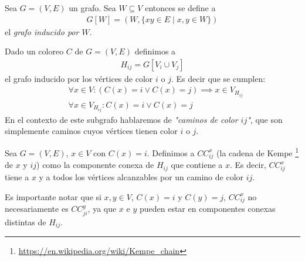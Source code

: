 \begin{comment}
\begin{proposition}\label{graph_cyclic_color}
  Un grafo cíclico $C_n$ con $n \ge 2$ es bipartito si $n$ es par y es
  $3$-coloreable si $n$ es impar. Es decir,
\begin{align}
    \chi(C_n) = 
    \begin{cases}
                2 & |\ \text{n es par} \\
                3 & |\ \text{n es impar}
    \end{cases}
\end{align}
\end{proposition}

\begin{proof}
  Visto en clase.
\end{proof}
\end{comment}

\begin{definition}
  Sea $G = (V, E)$ un grafo. Sea $W \subseteq V$ entonces se define a
  \begin{align}
    G[W] = \left(W, \{xy \in E \mid x,y \in W\}\right)
  \end{align}
  el \emph{grafo inducido por $W$}.
\end{definition}

\begin{definition}
Dado un coloreo $C$ de $G = (V,E)$ definimos a
\begin{align}
    H_{ij} = G\left[V_i \cup V_j\right]
\end{align}
el grafo inducido por los vértices de color $i$ o $j$.
Es decir que se cumplen:
\begin{align}
    &\forall x \in V \colon (C(x) = i \vee C(x) = j) \implies x \in V_{H_{ij}}\\
    &\forall x \in V_{H_{ij}} \colon C(x) = i \vee C(x) = j
\end{align}
En el contexto de este subgrafo hablaremos de \emph{"caminos de color $ij$"}, que son simplemente caminos cuyos vértices tienen color $i$ o $j$.
\end{definition}

\begin{definition}
Sea $G = (V, E)$, $x \in V$ con $C(x) = i$. Definimos a $CC^x_{ij}$ (la cadena de Kempe \footnote{\url{https://en.wikipedia.org/wiki/Kempe_chain}} de $x$ y $ij$) como la componente conexa de $H_{ij}$ que contiene a $x$.
Es decir, $CC^x_{ij}$ tiene a $x$ y a todos los vértices alcanzables por un camino de color $ij$.

Es importante notar que si $x,y \in V$, $C(x) = i$ y $C(y) = j$, $CC^x_{ij}$ no necesariamente es $CC^y_{ji}$, ya que $x$ e $y$ pueden estar en componentes conexas distintas de $H_{ij}$.
\end{definition}

